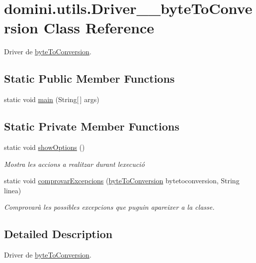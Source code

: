\hypertarget{classdomini_1_1utils_1_1Driver____byteToConversion}{}\section{domini.\+utils.\+Driver\+\_\+\+\_\+byte\+To\+Conversion Class Reference}
\label{classdomini_1_1utils_1_1Driver____byteToConversion}


Driver de \hyperlink{classdomini_1_1utils_1_1byteToConversion}{byte\+To\+Conversion}.  


\subsection*{Static Public Member Functions}
\begin{DoxyCompactItemize}
\item 
static void \hyperlink{classdomini_1_1utils_1_1Driver____byteToConversion_a19510acac17ad211538d878b4de039b8}{main} (String\mbox{[}$\,$\mbox{]} args)
\end{DoxyCompactItemize}
\subsection*{Static Private Member Functions}
\begin{DoxyCompactItemize}
\item 
static void \hyperlink{classdomini_1_1utils_1_1Driver____byteToConversion_a58412c0a63cc729003ca6d28bbc3b83b}{show\+Options} ()
\begin{DoxyCompactList}\small\item\em Mostra les accions a realitzar durant l\textquotesingle{}execució \end{DoxyCompactList}\item 
static void \hyperlink{classdomini_1_1utils_1_1Driver____byteToConversion_a82c589da57bedb139b9254c8623a7fd4}{comprovar\+Excepcions} (\hyperlink{classdomini_1_1utils_1_1byteToConversion}{byte\+To\+Conversion} bytetoconversion, String linea)
\begin{DoxyCompactList}\small\item\em Comprovarà les possibles excepcions que puguin apareixer a la classe. \end{DoxyCompactList}\end{DoxyCompactItemize}


\subsection{Detailed Description}
Driver de \hyperlink{classdomini_1_1utils_1_1byteToConversion}{byte\+To\+Conversion}. 

